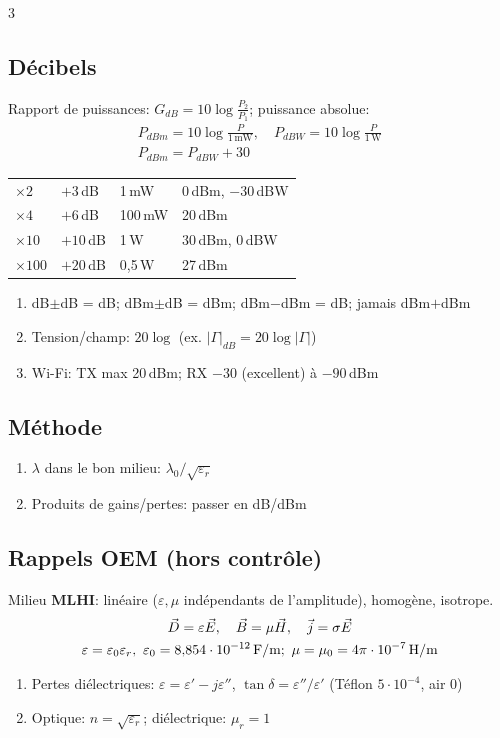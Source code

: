 \documentclass[12pt, a4paper]{article}
\newcommand{\ve}[1]{\vec{#1}}
\begin{document}
\begin{multicols*}{3}
	\subsection{Décibels}
	Rapport de puissances: $G_{dB}=10\log\frac{P_2}{P_1}$; puissance absolue:
	\begin{gather*}
		P_{dBm}=10\log\frac{P}{1\,\text{mW}},\quad P_{dBW}=10\log\frac{P}{1\,\text{W}}\\
		P_{dBm}=P_{dBW}+30
	\end{gather*}
	\begin{tabular}{|l|l||l|l|}
		\hline
		$\times2$  & $+3$\,dB  & 1\,mW   & 0\,dBm, $-30$\,dBW \\
		$\times4$  & $+6$\,dB  & 100\,mW & 20\,dBm            \\
		$\times10$ & $+10$\,dB & 1\,W    & 30\,dBm, 0\,dBW    \\
		$\times100$ & $+20$\,dB & 0,5\,W & 27\,dBm           \\
		\hline
	\end{tabular}
	\begin{enumerate}[\roman*.]
		\item dB$\pm$dB = dB; dBm$\pm$dB = dBm; dBm$-$dBm = dB; jamais dBm$+$dBm
		\item Tension/champ: $20\log$ (ex. $|\Gamma|_{dB}=20\log|\Gamma|$)
		\item Wi-Fi: TX max 20\,dBm; RX $-30$ (excellent) à $-90$\,dBm
	\end{enumerate}

	\subsection{Méthode}
	\begin{enumerate}[\roman*.]
		\item $\lambda$ dans le bon milieu: $\lambda_0/\sqrt{\varepsilon_r}$
		\item Produits de gains/pertes: passer en dB/dBm
	\end{enumerate}

	\colbreak
	\subsection{Rappels OEM (hors contrôle)}
	Milieu \textbf{MLHI}: linéaire ($\varepsilon,\mu$ indépendants de l'amplitude), homogène, isotrope.
	\begin{gather*}
		\ve D=\varepsilon\ve E,\quad\ve B=\mu\ve H,\quad\ve j=\sigma\ve E\\
		\varepsilon=\varepsilon_0\varepsilon_r,\ \varepsilon_0=8{,}854\cdot10^{-12}\text{\,F/m};\ \mu=\mu_0=4\pi\cdot10^{-7}\text{\,H/m}
	\end{gather*}
	\begin{enumerate}[\roman*.]
		\item Pertes diélectriques: $\varepsilon=\varepsilon'-j\varepsilon''$, $\tan\delta=\varepsilon''/\varepsilon'$ (Téflon $5\cdot10^{-4}$, air 0)
		\item Optique: $n=\sqrt{\varepsilon_r}$; diélectrique: $\mu_r=1$
	\end{enumerate}


\end{multicols*}
\end{document}
